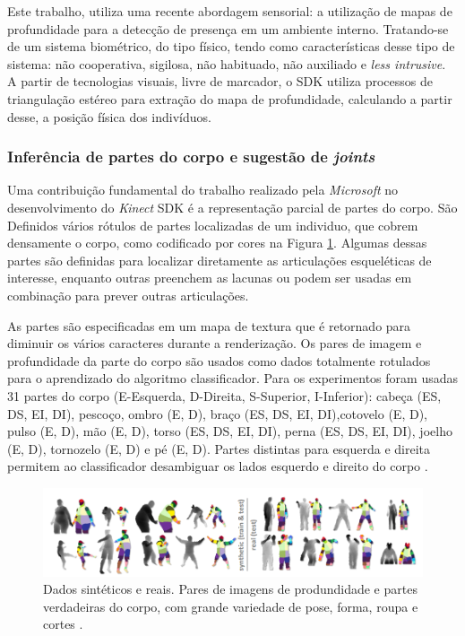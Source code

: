 Este trabalho, utiliza uma recente abordagem sensorial: a utilização de mapas de profundidade para a detecção de presença em um ambiente interno. Tratando-se de um sistema biométrico, do tipo físico, tendo como características desse tipo de sistema: não cooperativa, sigilosa, não habituado, não auxiliado e \textit{less intrusive}. A partir de tecnologias visuais, livre de marcador, o SDK utiliza processos de triangulação estéreo para extração do mapa de profundidade, calculando a partir desse, a posição física dos indivíduos.

\subsubsection{Inferência de partes do corpo e sugestão de \textit{joints}}\label{sec:bodyProposal}

Uma contribuição fundamental do trabalho realizado pela \textit{Microsoft} \cite{Shotton:2013:RHP:2398356.2398381} no desenvolvimento do \textit{Kinect} SDK é a representação parcial de partes do corpo. São Definidos vários rótulos de partes localizadas de um individuo, que cobrem densamente o corpo, como codificado por cores na Figura \ref{fig:bodyparts}. Algumas dessas partes são definidas para localizar diretamente as articulações esqueléticas de interesse, enquanto outras preenchem as lacunas ou podem ser usadas em combinação para prever outras articulações.

As partes são especificadas em um mapa de textura que é retornado para diminuir os vários caracteres durante a renderização. Os pares de imagem e profundidade da parte do corpo são usados como dados totalmente rotulados
para o aprendizado do algoritmo classificador. Para os experimentos foram usadas 31 partes do corpo (E-Esquerda, D-Direita, S-Superior, I-Inferior): cabeça (ES, DS, EI, DI), pescoço, ombro (E, D), braço (ES, DS, EI, DI),cotovelo (E, D), pulso (E, D), mão (E, D), torso (ES, DS, EI, DI), perna (ES, DS, EI, DI), joelho (E, D), tornozelo (E, D) e pé (E, D). Partes distintas para esquerda e direita permitem ao classificador desambiguar os lados esquerdo e direito do corpo \cite{Shotton:2013:RHP:2398356.2398381}.

\begin{figure}[ht]
\centering
\includegraphics[resolution=300,width=1.0\textwidth,natwidth=610,natheight=642]{images/body_parts.png}
    \caption{Dados sintéticos e reais. Pares de imagens de produndidade e partes verdadeiras do corpo, com grande variedade de pose, forma, roupa e cortes \cite{Shotton:2013:RHP:2398356.2398381}.}
    \label{fig:bodyparts}
\end{figure}

